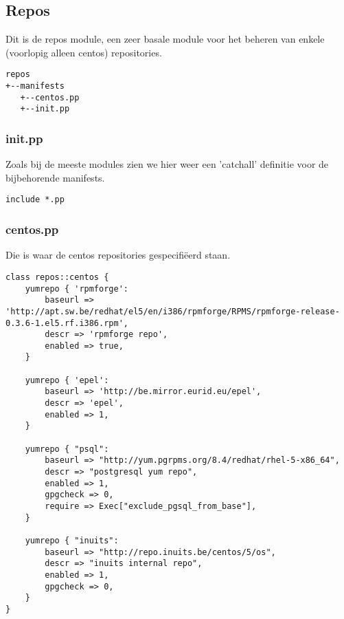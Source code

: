 \subsection{Repos}
Dit is de repos module, een zeer basale module voor het beheren van enkele (voorlopig alleen centos) repositories.
%
\begin{code}
\begin{lstlisting}
repos
+--manifests
   +--centos.pp
   +--init.pp
\end{lstlisting}
\end{code}
%
\subsubsection{init.pp}
Zoals bij de meeste modules zien we hier weer een 'catchall' definitie voor de bijbehorende manifests.
%
\begin{code}
\begin{lstlisting}
include *.pp
\end{lstlisting}
\end{code}
%
\subsubsection{centos.pp}
Die is waar de centos repositories gespecifi\"eerd staan.
\begin{code}
\begin{lstlisting}
class repos::centos {
	yumrepo { 'rpmforge':
		baseurl => 'http://apt.sw.be/redhat/el5/en/i386/rpmforge/RPMS/rpmforge-release-0.3.6-1.el5.rf.i386.rpm',
		descr => 'rpmforge repo',
		enabled => true,
	}

	yumrepo { 'epel':
		baseurl => 'http://be.mirror.eurid.eu/epel',
		descr => 'epel',
		enabled => 1,
	}

	yumrepo { "psql":
		baseurl => "http://yum.pgrpms.org/8.4/redhat/rhel-5-x86_64",
		descr => "postgresql yum repo",
		enabled => 1,
		gpgcheck => 0,
		require => Exec["exclude_pgsql_from_base"],
	}

	yumrepo { "inuits":
		baseurl => "http://repo.inuits.be/centos/5/os",
		descr => "inuits internal repo",	
		enabled => 1,
		gpgcheck => 0,
	}
}
\end{lstlisting}
\end{code}
